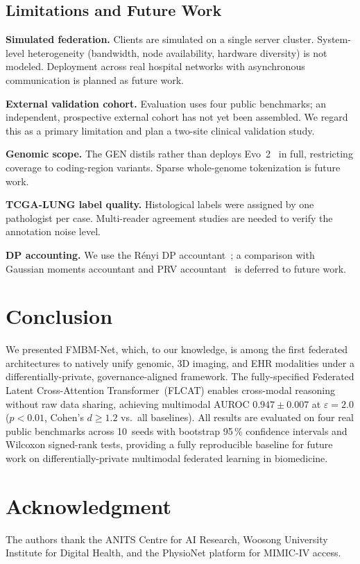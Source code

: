 \documentclass[journal,draftclsnofoot,10pt,onecolumn]{IEEEtran}
\begin{document}
\subsection{Limitations and Future Work}

\textbf{Simulated federation.}
Clients are simulated on a single server cluster. System-level heterogeneity
(bandwidth, node availability, hardware diversity) is not modeled.
Deployment across real hospital networks with asynchronous communication
is planned as future work.

\textbf{External validation cohort.}
Evaluation uses four public benchmarks; an independent, prospective external
cohort has not yet been assembled. We regard this as a primary limitation and
plan a two-site clinical validation study.

\textbf{Genomic scope.}
The GEN distils rather than deploys Evo~2~\cite{evo2_2026} in full,
restricting coverage to coding-region variants. Sparse whole-genome
tokenization is future work.

\textbf{TCGA-LUNG label quality.}
Histological labels were assigned by one pathologist per case.
Multi-reader agreement studies are needed to verify the annotation noise level.

\textbf{DP accounting.}
We use the R\'{e}nyi DP accountant~\cite{mironov2017renyi}; a comparison
with Gaussian moments accountant and PRV accountant~\cite{gopi2021prv}
is deferred to future work.

\section{Conclusion}
\label{sec:conclusion}

We presented FMBM-Net, which, to our knowledge, is among the first federated
architectures to natively unify genomic, 3D imaging, and EHR modalities under
a differentially-private, governance-aligned framework. The fully-specified
Federated Latent Cross-Attention Transformer~(FLCAT) enables cross-modal
reasoning without raw data sharing, achieving multimodal AUROC $0.947{\pm}0.007$
at $\varepsilon\!=\!2.0$ ($p\!<\!0.01$, Cohen's $d\!\geq\!1.2$ vs.\ all
baselines). All results are evaluated on four real public benchmarks across
10~seeds with bootstrap 95\,\% confidence intervals and Wilcoxon signed-rank
tests, providing a fully reproducible baseline for future work on
differentially-private multimodal federated learning in biomedicine.

\section*{Acknowledgment}
The authors thank the ANITS Centre for AI Research, Woosong University
Institute for Digital Health, and the PhysioNet platform for MIMIC-IV access.



\end{document}
